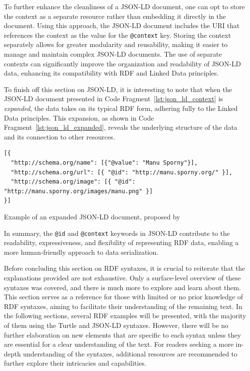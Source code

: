 \begin{itemize}
    To further enhance the cleanliness of a JSON-LD document, one can opt to store the context as a separate resource rather than embedding it directly in the document. Using this approach, the JSON-LD document includes the URI that references the context as the value for the \texttt{@context} key. Storing the context separately allows for greater modularity and reusability, making it easier to manage and maintain complex JSON-LD documents. The use of separate contexts can significantly improve the organization and readability of JSON-LD data, enhancing its compatibility with RDF and Linked Data principles. \citep{kellogg2020jsonld}

    To finish off this section on JSON-LD, it is interesting to note that when the JSON-LD document presented in Code Fragment~\ref{lst:json_ld_context} is \textit{expanded}, the data takes on its typical RDF form, adhering fully to the Linked Data principles. This expansion, as shown in Code Fragment~\ref{lst:json_ld_expanded}, reveals the underlying structure of the data and its connection to other resources. \citep{kellogg2020jsonld}

    \begin{listing}[htbp]
        \begin{verbatim}
[{
  "http://schema.org/name": [{"@value": "Manu Sporny"}],
  "http://schema.org/url": [{ "@id": "http://manu.sporny.org/" }],
  "http://schema.org/image": [{ "@id": "http://manu.sporny.org/images/manu.png" }]
}]
        \end{verbatim}
        \caption{Example of an expanded JSON-LD document, proposed by \cite{kellogg2020jsonld}}
        \label{lst:json_ld_expanded}
    \end{listing}

    In summary, the \texttt{@id} and \texttt{@context} keywords in JSON-LD contribute to the readability, expressiveness, and flexibility of representing RDF data, enabling a more human-friendly approach to data serialization.
    
\end{itemize}

Before concluding this section on RDF syntaxes, it is crucial to reiterate that the explanations provided are not exhaustive. Only a surface-level overview of these syntaxes was covered, and there is much more to explore and learn about them. This section serves as a reference for those with limited or no prior knowledge of RDF syntaxes, aiming to facilitate their understanding of the remaining text. In the following sections, several RDF examples will be presented, with the majority of them using the Turtle and JSON-LD syntaxes. However, there will be no further elaboration on new elements that are specific to each syntax unless they are essential for a clear understanding of the text. For readers seeking a more in-depth understanding of the syntaxes, additional resources are recommended to further explore their intricacies and capabilities.


